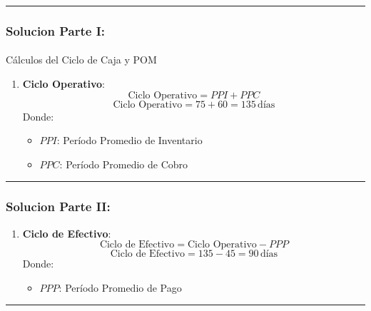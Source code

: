 \documentclass[
  letterpaper,
  DIV=11,
  numbers=noendperiod]{scrartcl}
\makeatletter
\let\oldparagraph\paragraph
\renewcommand{\paragraph}{
    \@ifstar
      \xxxParagraphStar
      \xxxParagraphNoStar
  }
\newcommand{\xxxParagraphStar}[1]{\oldparagraph*{#1}\mbox{}}
\newcommand{\xxxParagraphNoStar}[1]{\oldparagraph{#1}\mbox{}}
\providecommand{\tightlist}{%
  \setlength{\itemsep}{0pt}\setlength{\parskip}{0pt}}\usepackage{longtable,booktabs,array}
\makeatother
\begin{document}
\begin{center}\rule{0.5\linewidth}{0.5pt}\end{center}

\subsubsection{Solucion Parte I:}\label{solucion-parte-i}

\paragraph{Cálculos del Ciclo de Caja y
POM}\label{cuxe1lculos-del-ciclo-de-caja-y-pom}

\begin{enumerate}
\def\labelenumi{\arabic{enumi}.}
\tightlist
\item
  \textbf{Ciclo Operativo}: \[
  \text{Ciclo Operativo} = PPI + PPC
  \] \[
  \text{Ciclo Operativo} = 75 + 60 = 135 \, \text{días}
  \] Donde:

  \begin{itemize}
  \tightlist
  \item
    \(PPI\): Período Promedio de Inventario
  \item
    \(PPC\): Período Promedio de Cobro
  \end{itemize}
\end{enumerate}

\begin{center}\rule{0.5\linewidth}{0.5pt}\end{center}

\subsubsection{Solucion Parte II:}\label{solucion-parte-ii}

\begin{enumerate}
\def\labelenumi{\arabic{enumi}.}
\setcounter{enumi}{1}
\tightlist
\item
  \textbf{Ciclo de Efectivo}: \[
   \text{Ciclo de Efectivo} = \text{Ciclo Operativo} - PPP
   \] \[
   \text{Ciclo de Efectivo} = 135 - 45 = 90 \, \text{días}
   \] Donde:

  \begin{itemize}
  \tightlist
  \item
    \(PPP\): Período Promedio de Pago
  \end{itemize}
\end{enumerate}

\begin{center}\rule{0.5\linewidth}{0.5pt}\end{center}
\end{document}
